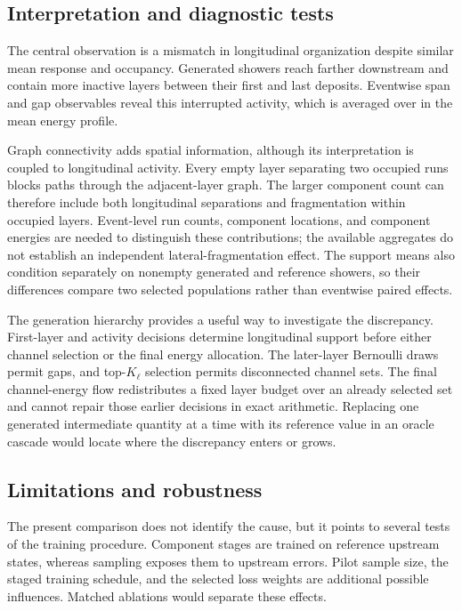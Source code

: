 \documentclass[11pt]{article}
\begin{document}
\subsection{Interpretation and diagnostic tests}

The central observation is a mismatch in longitudinal organization despite similar mean response and occupancy. Generated showers reach farther downstream and contain more inactive layers between their first and last deposits. Eventwise span and gap observables reveal this interrupted activity, which is averaged over in the mean energy profile.

Graph connectivity adds spatial information, although its interpretation is coupled to longitudinal activity. Every empty layer separating two occupied runs blocks paths through the adjacent-layer graph. The larger component count can therefore include both longitudinal separations and fragmentation within occupied layers. Event-level run counts, component locations, and component energies are needed to distinguish these contributions; the available aggregates do not establish an independent lateral-fragmentation effect. The support means also condition separately on nonempty generated and reference showers, so their differences compare two selected populations rather than eventwise paired effects.

The generation hierarchy provides a useful way to investigate the discrepancy. First-layer and activity decisions determine longitudinal support before either channel selection or the final energy allocation. The later-layer Bernoulli draws permit gaps, and top-$K_\ell$ selection permits disconnected channel sets. The final channel-energy flow redistributes a fixed layer budget over an already selected set and cannot repair those earlier decisions in exact arithmetic. Replacing one generated intermediate quantity at a time with its reference value in an oracle cascade would locate where the discrepancy enters or grows.

\subsection{Limitations and robustness}

The present comparison does not identify the cause, but it points to several tests of the training procedure. Component stages are trained on reference upstream states, whereas sampling exposes them to upstream errors. Pilot sample size, the staged training schedule, and the selected loss weights are additional possible influences. Matched ablations would separate these effects.
\end{document}
